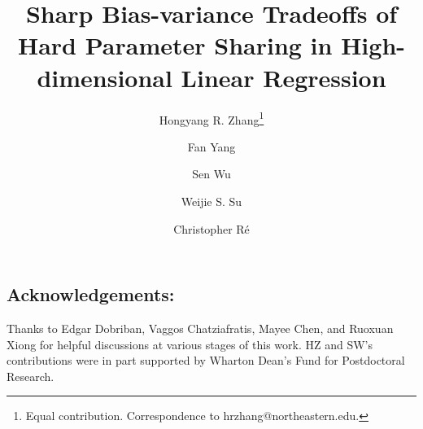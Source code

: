 \documentclass{article}
\newcommand*\samethanks[1][\value{footnote}]{\footnotemark[#1]}
\begin{document}
\title{\textbf{Sharp Bias-variance Tradeoffs of Hard Parameter Sharing in High-dimensional Linear Regression}}
\vspace{0.15in}
\author[1]{Hongyang R. Zhang\thanks{Equal contribution. Correspondence to hrzhang@northeastern.edu.}}
\author[2]{Fan Yang\samethanks}
\author[3]{Sen Wu}
\author[2]{Weijie S. Su}
\author[3]{Christopher R\'e}
\vspace{0.15in}



\maketitle



%


%
%




\subsection*{Acknowledgements:}
Thanks to Edgar Dobriban, Vaggos Chatziafratis, Mayee Chen, and Ruoxuan Xiong for helpful discussions at various stages of this work.
HZ and SW's contributions were in part supported by Wharton Dean's Fund for Postdoctoral Research.



\appendix







\end{document}
